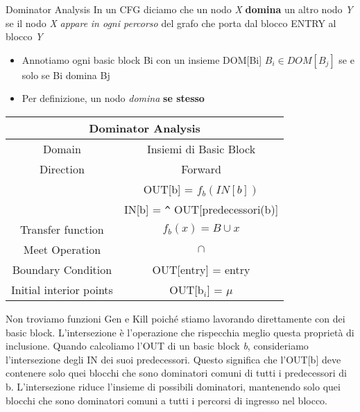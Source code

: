 \documentclass{article}
\begin{document}
\pagebreak
\begin{section}{Dominator Analysis}
	In un CFG diciamo che un nodo \textit{X} \textbf{domina} un altro	nodo \textit{Y} se il nodo \textit{X}	\textit{appare} \textit{in ogni percorso	}del grafo che porta dal 	blocco ENTRY al blocco \textit{Y}
	\begin{itemize}
		\item Annotiamo ogni basic block Bi con un insieme DOM[Bi]
			\subitem $B_i \in DOM[B_j]$ se e solo se Bi domina Bj
		\item Per definizione, un nodo \textit{domina} \textbf{se stesso}
	\end{itemize}
\begin{longtable}{| c | c |}
	\hline
	\multicolumn{2}{|c|}{\textbf{Dominator Analysis}} \\
	\hline
	Domain & Insiemi di Basic Block\\
	\hline
	Direction & Forward \\
	& OUT[b] = $f_b (IN[b])$ \\
	& IN[b] = \verb*|^| OUT[predecessori(b)] \\
	\hline
	Transfer function &  $f_b(x) = B \cup x$\\
	\hline
	Meet Operation & $\cap$ \\
	\hline
	Boundary Condition & OUT[entry] = entry \\
	\hline
	Initial interior points & OUT[b$_i$] = $\mu$ \\
	\hline
\end{longtable}
Non troviamo funzioni Gen e Kill poiché stiamo lavorando direttamente con dei basic block. L'intersezione è l'operazione che rispecchia meglio questa proprietà di inclusione. Quando calcoliamo l'OUT di un basic block \textit{b}, consideriamo l'intersezione degli IN dei suoi predecessori. Questo significa che l'OUT[b] deve contenere solo quei blocchi che sono dominatori comuni di tutti i predecessori di b.
\newline\newline
L'intersezione riduce l'insieme di possibili dominatori, mantenendo solo quei blocchi che sono dominatori comuni a tutti i percorsi di ingresso nel blocco.


\end{section}
\end{document}
